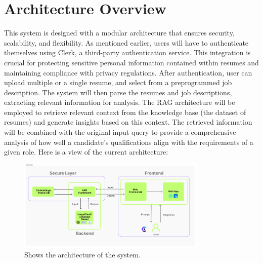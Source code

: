 \documentclass[12pt]{report}
\begin{document}
\section{Architecture Overview}
This system is designed with a modular architecture that ensures security, scalability, and flexibility. As mentioned earlier, users will have to authenticate themselves using Clerk, a third-party authentication service. This integration is crucial for protecting sensitive personal information contained within resumes and maintaining compliance with privacy regulations. After authentication, user can  upload multiple or a single resume, and select from a preprogrammed job description. The system will then parse the resumes and job descriptions, extracting relevant information for analysis. The RAG architecture will be employed to retrieve relevant context from the knowledge base (the dataset of resumes) and generate insights based on this context. The retrieved information will be combined with the original input query to provide a comprehensive analysis of how well a candidate's qualifications align with the requirements of a given role. Here is a view of the current architecture:

\begin{figure}[h]
    \centering
    \includegraphics[width=0.8\textwidth]{images/System_Arch.png}
    \caption{Shows the architecture of the system.}
    \label{fig:architecture_diagram}
\end{figure}
\end{document}
